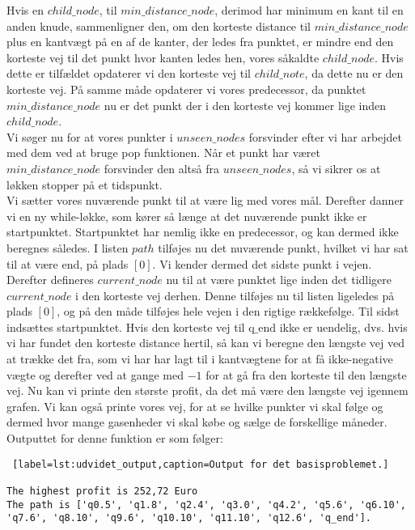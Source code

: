 Hvis en $child\_node$, til  $min\_distance\_node$, derimod har minimum en kant til en anden knude, sammenligner den, om den korteste distance til $min\_distance\_node$ plus en kantvægt på en af de kanter, der ledes fra punktet, er mindre end den korteste vej til det punkt hvor kanten ledes hen, vores såkaldte $child\_node$. Hvis dette er tilfældet opdaterer vi den korteste vej til $child\_note$, da dette nu er den korteste vej. På samme måde opdaterer vi vores predecessor, da punktet $min\_distance\_node$ nu er det punkt der i den korteste vej kommer lige inden $child\_node$.\\
Vi søger nu for at vores punkter i $unseen\_nodes$ forsvinder efter vi har arbejdet med dem ved at bruge pop funktionen. Når et punkt har været $min\_distance\_node$ forsvinder den altså fra $unseen\_nodes$, så vi sikrer os at løkken stopper på et tidspunkt. \\
Vi sætter vores nuværende punkt til at være lig med vores mål.
Derefter danner vi en ny while-løkke, som kører så længe at det nuværende punkt ikke er startpunktet. Startpunktet har nemlig ikke en predecessor, og kan dermed ikke beregnes således. I listen $path$ tilføjes nu det nuværende punkt, hvilket vi har sat til at være $\textrm{end}$, på plads $[0]$. Vi kender dermed det sidste punkt i vejen. Derefter defineres $current\_node$ nu til at være punktet lige inden det tidligere $current\_node$ i den korteste vej derhen. Denne tilføjes nu til listen ligeledes på plads $[0]$, og på den måde tilføjes hele vejen i den rigtige rækkefølge. Til sidst indsættes startpunktet.
Hvis den korteste vej til $\textrm{q\_end}$ ikke er uendelig, dvs. hvis vi har fundet den korteste distance hertil, så kan vi beregne den længste vej ved at trække det fra, som vi har har lagt til i kantvægtene for at få ikke-negative vægte og derefter ved at gange med $-1$ for at gå fra den korteste til den længste vej. 
Nu kan vi printe den største profit, da det må være den længste vej igennem grafen. Vi kan også printe vores vej, for at se hvilke punkter vi skal følge og dermed hvor mange gasenheder vi skal købe og sælge de forskellige måneder.
Outputtet for denne funktion er som følger:
\begin{lstlisting} [label=lst:udvidet_output,caption=Output for det basisproblemet.]

The highest profit is 252,72 Euro
The path is ['q0.5', 'q1.8', 'q2.4', 'q3.0', 'q4.2', 'q5.6', 'q6.10', 'q7.6', 'q8.10', 'q9.6', 'q10.10', 'q11.10', 'q12.6', 'q_end'].

\end{lstlisting}
